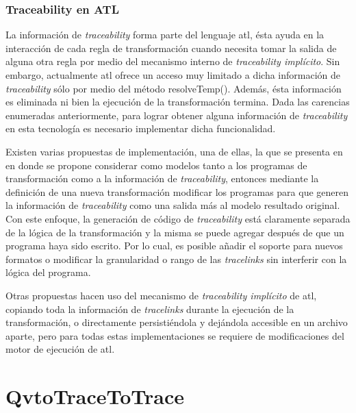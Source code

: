 \documentclass[a4paper,12pt,oneside,spanish]{book}
\begin{document}
\subsection*{Traceability en ATL}
\label{cap:ATLTtraceability}

La información de \textit{traceability} forma parte del lenguaje \gls{atl}, ésta ayuda en la interacción de cada regla de transformación cuando necesita tomar la salida de alguna otra regla por medio del mecanismo interno de \textit{traceability implícito}. Sin embargo, actualmente \gls{atl} ofrece un acceso muy limitado a dicha información de \textit{traceability} sólo por medio del método \textsf{resolveTemp()}. Además, ésta información es eliminada ni bien la ejecución de la transformación termina. Dada las carencias enumeradas anteriormente, para lograr obtener alguna información de \textit{traceability} en esta tecnología es necesario implementar dicha funcionalidad.

Existen varias propuestas de implementación, una de ellas, la que se presenta en \cite{Jouault} en donde se propone considerar como modelos tanto a los programas de transformación como a la información de \textit{traceability}, entonces mediante la definición de una nueva transformación modificar los programas para que generen la información de \textit{traceability} como una salida más al modelo resultado original. Con este enfoque, la generación de código de \textit{traceability} está claramente separada de la lógica de la transformación y la misma se puede agregar después de que un programa haya sido escrito. Por lo cual, es posible añadir el soporte para nuevos formatos o modificar la granularidad o rango de las \textit{tracelinks} sin interferir con la lógica del programa.

Otras propuestas hacen uso del mecanismo de \textit{traceability implícito} de \gls{atl}, copiando toda la información de \textit{tracelinks} durante la ejecución de la transformación, o directamente persistiéndola y dejándola accesible en un archivo aparte, pero para todas estas implementaciones se requiere de modificaciones del motor de ejecución de \gls{atl}.


\appendix
\clearpage
\addappheadtotoc
\appendixpage



\chapter{QvtoTrace{\textunderscore}To{\textunderscore}Trace}
\label{cap:QvtoTraceToTrace}
\end{document}
